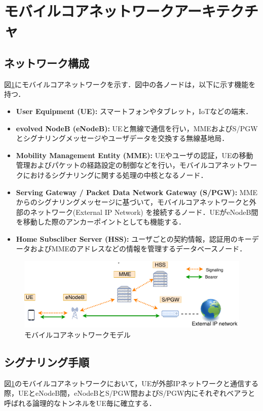 \documentclass[technicalreport]{ieicej-rev}
\begin{document}
\section{モバイルコアネットワークアーキテクチャ}
\label{sec:モバイルコアネットワークアーキテクチャ}
  \subsection{ネットワーク構成}
    図\ref{networkmodel}にモバイルコアネットワークを示す．図中の各ノードは，以下に示す機能を持つ．
    \begin{itemize}
      \item \textbf{User Equipment (UE):} スマートフォンやタブレット，IoTなどの端末．
      \item \textbf{evolved NodeB (eNodeB):} UEと無線で通信を行い，MMEおよびS/PGWとシグナリングメッセージやユーザデータを交換する無線基地局．
      \item \textbf{Mobility Management Entity (MME):} UEやユーザの認証，UEの移動管理およびパケットの経路設定の制御などを行い，モバイルコアネットワークにおけるシグナリングに関する処理の中核となるノード．
      \item \textbf{Serving Gateway / Packet Data Network Gateway (S/PGW):} MMEからのシグナリングメッセージに基づいて，モバイルコアネットワークと外部のネットワーク(External IP Network) を接続するノード．UEがeNodeB間を移動した際のアンカーポイントとしても機能する．
      \item \textbf{Home Subscliber Server (HSS):} ユーザごとの契約情報，認証用のキーデータおよびMMEのアドレスなどの情報を管理するデータベースノード．
    \end{itemize}
    \begin{figure}[!t]
      \centering
      \includegraphics[width=1\hsize]{networkmodel.pdf}
      \caption{モバイルコアネットワークモデル}
      \label{networkmodel}
    \end{figure}

  \subsection{シグナリング手順}
  \label{sec:signaling}
  図\ref{networkmodel}のモバイルコアネットワークにおいて，UEが外部IPネットワークと通信する際，UEとeNodeB間，eNodeBとS/PGW間およびS/PGW内にそれぞれベアラと呼ばれる論理的なトンネルをUE毎に確立する．
\end{document}
